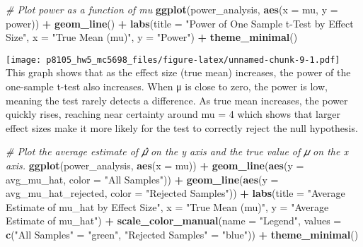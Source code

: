 \documentclass[
]{article}
\newenvironment{Shaded}{\begin{snugshade}}{\end{snugshade}}
\newcommand{\AttributeTok}[1]{\textcolor[rgb]{0.13,0.29,0.53}{#1}}
\newcommand{\CommentTok}[1]{\textcolor[rgb]{0.56,0.35,0.01}{\textit{#1}}}
\newcommand{\FunctionTok}[1]{\textcolor[rgb]{0.13,0.29,0.53}{\textbf{#1}}}
\newcommand{\NormalTok}[1]{#1}
\newcommand{\OtherTok}[1]{\textcolor[rgb]{0.56,0.35,0.01}{#1}}
\newcommand{\SpecialCharTok}[1]{\textcolor[rgb]{0.81,0.36,0.00}{\textbf{#1}}}
\newcommand{\StringTok}[1]{\textcolor[rgb]{0.31,0.60,0.02}{#1}}
\begin{document}
\begin{Shaded}
\begin{Highlighting}[]
\CommentTok{\# Plot power as a function of mu}
\FunctionTok{ggplot}\NormalTok{(power\_analysis, }\FunctionTok{aes}\NormalTok{(}\AttributeTok{x =}\NormalTok{ mu, }\AttributeTok{y =}\NormalTok{ power)) }\SpecialCharTok{+}
  \FunctionTok{geom\_line}\NormalTok{() }\SpecialCharTok{+}
  \FunctionTok{labs}\NormalTok{(}\AttributeTok{title =} \StringTok{"Power of One Sample t{-}Test by Effect Size"}\NormalTok{,}
       \AttributeTok{x =} \StringTok{"True Mean (mu)"}\NormalTok{,}
       \AttributeTok{y =} \StringTok{"Power"}\NormalTok{) }\SpecialCharTok{+}
  \FunctionTok{theme\_minimal}\NormalTok{()}
\end{Highlighting}
\end{Shaded}

\texttt{[image: p8105\_hw5\_mc5698\_files/figure-latex/unnamed-chunk-9-1.pdf]}
This graph shows that as the effect size (true mean) increases, the
power of the one-sample t-test also increases. When μ is close to zero,
the power is low, meaning the test rarely detects a difference. As true
mean increases, the power quickly rises, reaching near certainty around
mu = 4 which shows that larger effect sizes make it more likely for the
test to correctly reject the null hypothesis.

\begin{Shaded}
\begin{Highlighting}[]
\CommentTok{\# Plot the average estimate of 𝜇̂ on the y axis and the true value of 𝜇 on the x axis.}
\FunctionTok{ggplot}\NormalTok{(power\_analysis, }\FunctionTok{aes}\NormalTok{(}\AttributeTok{x =}\NormalTok{ mu)) }\SpecialCharTok{+}
  \FunctionTok{geom\_line}\NormalTok{(}\FunctionTok{aes}\NormalTok{(}\AttributeTok{y =}\NormalTok{ avg\_mu\_hat, }\AttributeTok{color =} \StringTok{"All Samples"}\NormalTok{)) }\SpecialCharTok{+}
  \FunctionTok{geom\_line}\NormalTok{(}\FunctionTok{aes}\NormalTok{(}\AttributeTok{y =}\NormalTok{ avg\_mu\_hat\_rejected, }\AttributeTok{color =} \StringTok{"Rejected Samples"}\NormalTok{)) }\SpecialCharTok{+}
  \FunctionTok{labs}\NormalTok{(}\AttributeTok{title =} \StringTok{"Average Estimate of mu\_hat by Effect Size"}\NormalTok{,}
       \AttributeTok{x =} \StringTok{"True Mean (mu)"}\NormalTok{,}
       \AttributeTok{y =} \StringTok{"Average Estimate of mu\_hat"}\NormalTok{) }\SpecialCharTok{+}
  \FunctionTok{scale\_color\_manual}\NormalTok{(}\AttributeTok{name =} \StringTok{"Legend"}\NormalTok{, }\AttributeTok{values =} \FunctionTok{c}\NormalTok{(}\StringTok{"All Samples"} \OtherTok{=} \StringTok{"green"}\NormalTok{, }\StringTok{"Rejected Samples"} \OtherTok{=} \StringTok{"blue"}\NormalTok{)) }\SpecialCharTok{+}
  \FunctionTok{theme\_minimal}\NormalTok{()}
\end{Highlighting}
\end{Shaded}
\end{document}
